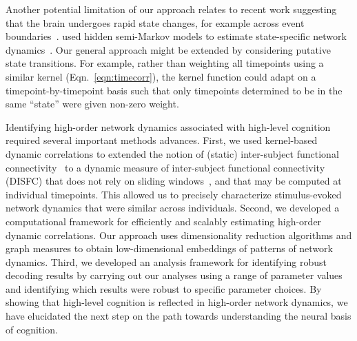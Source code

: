 \documentclass[english]{article}
\begin{document}
Another potential limitation of our approach relates to recent work
suggesting that the brain undergoes rapid state changes, for example
across event boundaries~\citep[e.g.,][]{BaldEtal17}.
\cite{ShapEtal19} used hidden semi-Markov models to estimate
state-specific network dynamics~\citep[also see][]{VidaEtal18}.  Our
general approach might be extended by considering putative state
transitions. For example, rather than weighting all timepoints using a
similar kernel (Eqn.~\ref{eqn:timecorr}), the kernel function could
adapt on a timepoint-by-timepoint basis such that only timepoints
determined to be in the same ``state'' were given non-zero weight.

Identifying high-order network dynamics associated with high-level
cognition required several important methods advances.  First, we used
kernel-based dynamic correlations to extended the notion of (static)
inter-subject functional connectivity~\citep{SimoEtal16} to a dynamic
measure of inter-subject functional connectivity (DISFC) that does not
rely on sliding windows~\citep[e.g., as in][]{MannEtal18}, and that
may be computed at individual timepoints.  This allowed us to
precisely characterize stimulus-evoked network dynamics that were
similar across individuals.  Second, we developed a computational
framework for efficiently and scalably estimating high-order dynamic
correlations.  Our approach uses dimensionality reduction algorithms
and graph measures to obtain low-dimensional embeddings of patterns of
network dynamics.  Third, we developed an analysis framework for
identifying robust decoding results by carrying out our analyses using
a range of parameter values and identifying which results were robust
to specific parameter choices. By showing that high-level cognition is
reflected in high-order network dynamics, we have elucidated the next
step on the path towards understanding the neural basis of cognition.
\end{document}
